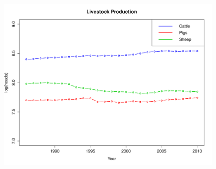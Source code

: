 \documentclass[a4paper,10pt]{article}
\begin{document}
\newpage
\begin{center}
\begin{figure}[H]
\begin{center}
\includegraphics[scale=.80]{FIGURES/production.pdf}
\end{center}
\caption{}
\label{sfig:prod}
\end{figure}
\end{center}
\newpage
\end{document}
